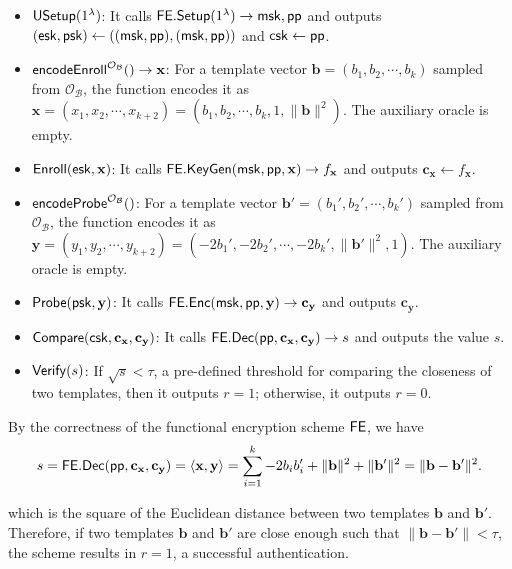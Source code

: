 \begin{itemize}

	\item ${\sf USetup}(1^\lambda)$: It calls ${\sf FE.Setup}(1^\lambda) \to {\sf msk}, {\sf pp}$ and outputs $({\sf esk}, {\sf psk}) \gets (({\sf msk}, {\sf pp}), ({\sf msk}, {\sf pp}))$ and ${\sf csk} \gets {\sf pp}$.

	\item ${\sf encodeEnroll}^{\mathcal{O}_{\mathcal{B}}}() \to \mathbf{x}$: For a template vector $\mathbf{b} = (b_1, b_2, \cdots, b_k)$ sampled from $\mathcal{O}_{\mathcal{B}}$, the function encodes it as $\mathbf{x} = (x_1, x_2, \cdots, x_{k+2}) = (b_1, b_2, \cdots, b_k, 1, \|\mathbf{b}\|^2)$. The auxiliary oracle is empty.

	\item ${\sf Enroll}({\sf esk}, \mathbf{x})$: It calls ${\sf FE.KeyGen}({\sf msk}, {\sf pp}, \mathbf{x}) \to f_\mathbf{x}$ and outputs $\mathbf{c_x} \gets f_\mathbf{x}$.

	\item ${\sf encodeProbe}^{\mathcal{O}_{\mathcal{B}}}()$: For a template vector $\mathbf{b'} = (b_1', b_2', \cdots, b_k')$ sampled from $\mathcal{O}_{\mathcal{B}}$, the function encodes it as $\mathbf{y} = (y_1, y_2, \cdots, y_{k+2}) = (-2b_1', -2b_2', \cdots, -2b_k', \|\mathbf{b'}\|^2, 1)$. The auxiliary oracle is empty.

	\item ${\sf Probe}({\sf psk}, \mathbf{y})$: It calls ${\sf FE.Enc}({\sf msk}, {\sf pp}, \mathbf{y}) \to \mathbf{c_y}$ and outputs $\mathbf{c_y}$.

	\item ${\sf Compare}({\sf csk}, \mathbf{c_x}, \mathbf{c_y)}$: It calls ${\sf FE.Dec}({\sf pp}, \mathbf{c_x}, \mathbf{c_y}) \to s$ and outputs the value $s$.

	\item ${\sf Verify}(s)$: If $\sqrt{s} < \tau$, a pre-defined threshold for comparing the closeness of two templates, then it outputs $r = 1$; otherwise, it outputs $r = 0$.

\end{itemize}

By the correctness of the functional encryption scheme $\sf FE$, we have
\[
	s = {\sf FE.Dec}({\sf pp}, \mathbf{c_x}, \mathbf{c_y}) = \langle \mathbf{x}, \mathbf{y} \rangle = \sum_{i=1}^k -2b_ib_i' + \|\mathbf{b}\|^2 + \|\mathbf{b'}\|^2 = \| \mathbf{b} - \mathbf{b'} \|^2.
\]

which is the square of the Euclidean distance between two templates $\mathbf{b}$ and $\mathbf{b}'$. Therefore, if two templates $\mathbf{b}$ and $\mathbf{b}'$ are close enough such that $\|\mathbf{b} - \mathbf{b'}\| < \tau$, the scheme results in $r = 1$, a successful authentication.


